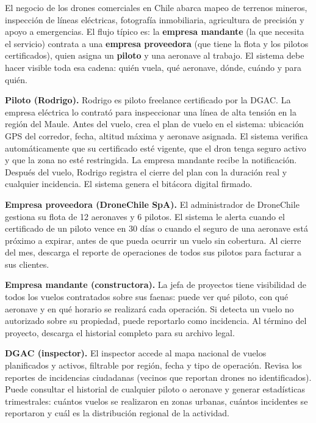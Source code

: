 \documentclass[12pt]{article}
\begin{document}
El negocio de los drones comerciales en Chile abarca mapeo de terrenos
mineros, inspección de líneas eléctricas, fotografía inmobiliaria,
agricultura de precisión y apoyo a emergencias. El flujo típico es:
la \textbf{empresa mandante} (la que necesita el servicio) contrata a una
\textbf{empresa proveedora} (que tiene la flota y los pilotos certificados),
quien asigna un \textbf{piloto} y una aeronave al trabajo. El sistema debe
hacer visible toda esa cadena: quién vuela, qué aeronave, dónde, cuándo
y para quién.

\noindent\textbf{Piloto (Rodrigo).}
Rodrigo es piloto freelance certificado por la DGAC. La empresa eléctrica lo
contrató para inspeccionar una línea de alta tensión en la región del Maule.
Antes del vuelo, crea el plan de vuelo en el sistema: ubicación GPS del
corredor, fecha, altitud máxima y aeronave asignada. El sistema verifica
automáticamente que su certificado esté vigente, que el dron tenga seguro
activo y que la zona no esté restringida. La empresa mandante recibe la
notificación. Después del vuelo, Rodrigo registra el cierre del plan con la
duración real y cualquier incidencia. El sistema genera el bitácora digital
firmado.

\noindent\textbf{Empresa proveedora (DroneChile SpA).}
El administrador de DroneChile gestiona su flota de 12 aeronaves y 6 pilotos.
El sistema le alerta cuando el certificado de un piloto vence en 30 días o
cuando el seguro de una aeronave está próximo a expirar, antes de que pueda
ocurrir un vuelo sin cobertura. Al cierre del mes, descarga el reporte de
operaciones de todos sus pilotos para facturar a sus clientes.

\noindent\textbf{Empresa mandante (constructora).}
La jefa de proyectos tiene visibilidad de todos los vuelos contratados sobre
sus faenas: puede ver qué piloto, con qué aeronave y en qué horario se
realizará cada operación. Si detecta un vuelo no autorizado sobre su
propiedad, puede reportarlo como incidencia. Al término del proyecto,
descarga el historial completo para su archivo legal.

\noindent\textbf{DGAC (inspector).}
El inspector accede al mapa nacional de vuelos planificados y activos,
filtrable por región, fecha y tipo de operación. Revisa los reportes de
incidencias ciudadanas (vecinos que reportan drones no identificados).
Puede consultar el historial de cualquier piloto o aeronave y generar
estadísticas trimestrales: cuántos vuelos se realizaron en zonas urbanas,
cuántos incidentes se reportaron y cuál es la distribución regional de la
actividad.
\end{document}
